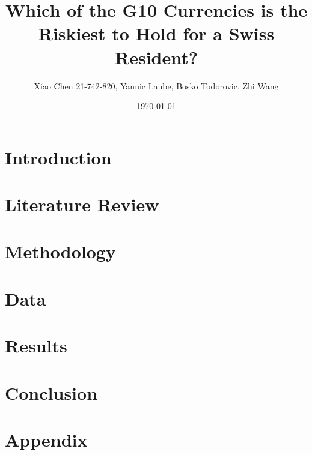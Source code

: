\documentclass[a4paper, 12pt]{article}
\title{\textbf{Which of the G10 Currencies is the Riskiest to Hold for a Swiss Resident?}}
\author{Xiao Chen 21-742-820, Yannic Laube, Bosko Todorovic, Zhi Wang}
\date{\today}
\begin{document}
\maketitle
\section{Introduction}
\section{Literature Review}
\section{Methodology}
\section{Data}
\section{Results}
\section{Conclusion}
\section*{Appendix}
\end{document}
